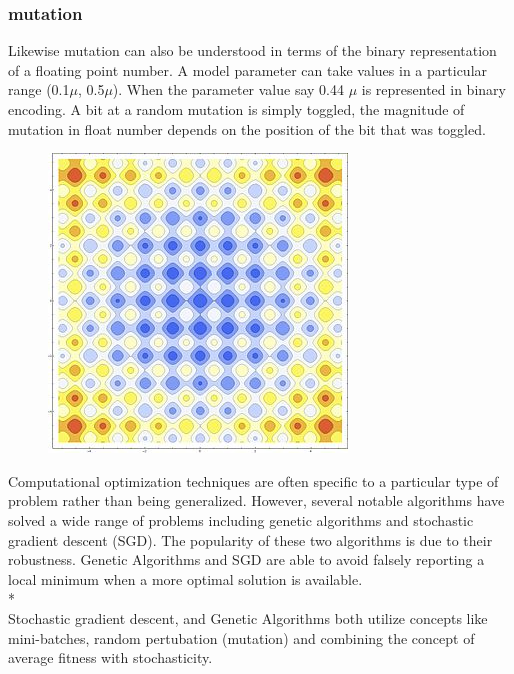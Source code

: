 \subsubsection{mutation}
Likewise mutation can also be understood in terms of the binary representation of a floating point number. A model parameter can take values in a particular range (0.1$\mu$, 0.5$\mu$). When the parameter value say 0.44 $\mu$ is represented in binary encoding. A bit at a random mutation is simply toggled, the magnitude of mutation in float number depends on the position of the bit that was toggled.
\begin{figure}
\includegraphics[]{figures/rastagrind.jpg}
\end{figure}


Computational optimization techniques are often specific to a particular type of problem rather than being generalized. However, several notable algorithms have solved a wide range of problems including genetic algorithms and stochastic gradient descent (SGD). The popularity of these two algorithms is due to their robustness. Genetic Algorithms and SGD are able to avoid falsely reporting a local minimum when a more optimal solution is available.\\*
\\
Stochastic gradient descent, and Genetic Algorithms both utilize concepts like mini-batches, random pertubation (mutation) and combining the concept of average fitness with stochasticity. \\



